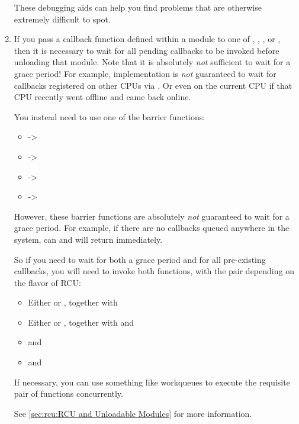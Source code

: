 \begin{enumerate}[start=0]

	These debugging aids can help you find problems that are
	otherwise extremely difficult to spot.

\item	If you pass a callback function defined within a module
	to one of , , , or
	, then it is necessary to wait for all
	pending callbacks to be invoked before unloading that module.
	Note that it is absolutely \emph{not} sufficient to wait for a grace
	period!
	For example,  implementation is \emph{not}
	guaranteed to wait for callbacks registered on other CPUs via
	.
	Or even on the current CPU if that CPU recently
	went offline and came back online.

	You instead need to use one of the barrier functions:

	\begin{itemize}
	\item	{} -> 
	\item	{} -> 
	\item	{} -> 
	\item	{} -> 
        \end{itemize}

	However, these barrier functions are absolutely \emph{not} guaranteed
	to wait for a grace period.
	For example, if there are no
	 callbacks queued anywhere in the system, 
	can and will return immediately.

	So if you need to wait for both a grace period and for all
	pre-existing callbacks, you will need to invoke both functions,
	with the pair depending on the flavor of RCU\@:

        \begin{itemize}
	\item	Either  or ,
		together with 
	\item	Either  or ,
		together with and 
	\item	{} and 
	\item	{} and 
	\end{itemize}

	If necessary, you can use something like workqueues to execute
	the requisite pair of functions concurrently.

	See \cref{sec:rcu:RCU and Unloadable Modules} for more information.
\end{enumerate}
